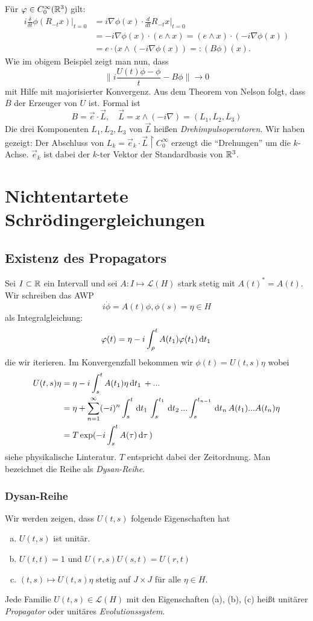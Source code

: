 \documentclass{mycourse}
\begin{document}
Für $\phi\in C_0^\infty(\R^3)$ gilt:
\begin{align*}
i \frac{\delta}{\delta t} \phi(R_{-t}x)|_{t=0} &= i \nabla \phi(x) \cdot \frac{d}{dt} R_{-t} x|_{t=0}\\
&=-i \nabla \phi(x) \cdot (e \land x) = (e\land x) \cdot (-i \nabla \phi(x))\\&= e\cdot (x \land(-i \nabla \phi(x)) =: (B\phi)(x).
\end{align*}
Wie im obigem Beispiel zeigt man  nun, dass 
\[
\|i \frac{U(t)\phi- \phi}{t} - B\phi\| \to 0
\]
mit Hilfe mit majorisierter Konvergenz. Aus dem Theorem von Nelson folgt, dass $\overline{B}$ der Erzeuger von $U$ ist. Formal ist
\[
B=\vec e \cdot \vec L, \quad \vec L=x \land (-i \nabla) =(L_1, L_2, L_3)
\]
Die drei Komponenten $L_1, L_2, L_3$ von $\vec L$ heißen \emph{Drehimpulsoperatoren}. Wir haben gezeigt: Der Abschluss von $L_k=\vec e_k \cdot \vec L \upharpoonright C_0^\infty$ erzeugt die "`Drehungen"' um die $k$-Achse. $\vec e_k$ ist dabei der $k$-ter Vektor der Standardbasis von $\R^3$.

\chapter{Nichtentartete Schrödingergleichungen}

\section{Existenz des Propagators}
Sei $I\subset \R$ ein Intervall und sei $A: I \mapsto \mathcal L(H)$ stark stetig mit $A(t)^*=A(t)$. Wir schreiben das AWP
\[
i \dot \phi = A(t) \phi, \phi(s)=\eta \in H
\]
als Integralgleichung:
\[
\phi(t)=\eta-i \int_\rho^t A(t_1) \phi(t_1) \dx[t_1]
\]
die wir iterieren. Im Konvergenzfall bekommen wir $\phi(t)=U(t,s) \eta$ wobei
\begin{align*}
U(t,s) \eta&= \eta- i \int_s^t A(t_1) \eta \dx[t_1]+ ... \\
&= \eta + \sum_{n=1}^\infty (-i)^n \int_s^t \dx[t_1] \int_s^{t_1} \dx[t_2] ... \int_s^{t_{n-1}} \dx[t_n] A(t_1)... A(t_n) \eta\\
&=T \exp(-i \int_s^t A(\tau) \dx[\tau])
\end{align*}
siehe physikalische Linteratur. $T$ entspricht dabei der Zeitordnung. Man bezeichnet die Reihe als \emph{Dysan-Reihe}.
\subsection{Dysan-Reihe}
Wir werden zeigen, dass $U(t,s)$ folgende Eigenschaften hat
\begin{enumerate}[a)]
\item $U(t,s)$ ist unitär.
\item $U(t, t)=1$ und $U(r,s)U(s,t)= U(r,t)$
\item $(t,s)\mapsto U(t,s) \eta$ stetig auf $J\times J$ für alle $\eta \in H$.
\end{enumerate}
Jede Familie $U(t,s)\in \mathcal L(H)$ mit den Eigenschaften (a), (b), (c) heißt unitärer \emph{Propagator} oder unitäres  \emph{Evolutionssystem}.
\end{document}
